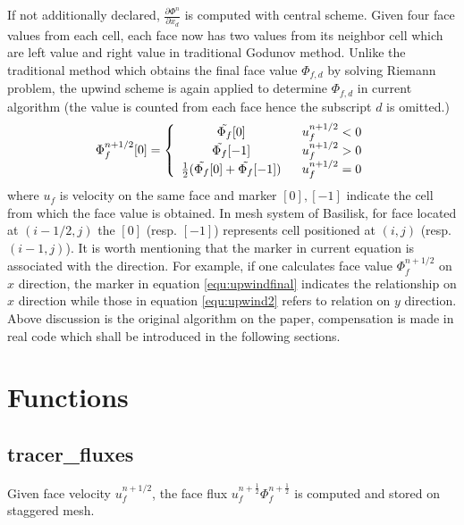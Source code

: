 \documentclass[a4paper]{article}
\newcommand{\func}[1]{\textbf{\textcolor{function}{#1}}}
\begin{document}
If not additionally declared, $\frac{\partial \Phi^n}{\partial x_d}$ is computed with central scheme.
Given four face values from each cell, each face now has two values from its neighbor cell which are left value and right value in traditional Godunov method. Unlike the traditional method which obtains the final face value $\Phi_{f,d}$ by solving Riemann problem, the upwind scheme is again applied to determine $\Phi_{f,d}$ in current algorithm (the value is counted from each face hence the subscript $d$ is omitted.)
\begin{equation}
    \Phi^{n+1/2}_{f}[0] = \left\{
    \begin{array}{cc}
         \Tilde{\Phi_f}[0]\ \ &u^{n+1/2}_f<0\\
         \Tilde{\Phi_f}[-1]\ \ &u^{n+1/2}_f>0\\
         \frac{1}{2}(\Tilde{\Phi_f}[0]+\Tilde{\Phi_f}[-1])\ \ &u^{n+1/2}_f=0
    \end{array}
    \right.
    \label{equ:upwindfinal}
\end{equation}
where $u_f$ is velocity on the same face and marker $[0],[-1]$ indicate the cell from which the face value is obtained. In mesh system of Basilisk, for face located at $(i-1/2,j)$ the $[0]$ (resp. $[-1]$) represents cell positioned at $(i,j)$ (resp. $(i-1,j)$). It is worth mentioning that the marker in current equation is associated with the direction. For example, if one calculates face value $\Phi_f^{n+1/2}$ on $x$ direction, the marker in equation \ref{equ:upwindfinal} indicates the relationship on $x$ direction while those in equation \ref{equ:upwind2} refers to relation on $y$ direction. Above discussion is the original algorithm on the paper, compensation is made in real code which shall be introduced in the following sections.
\section{Functions}

\subsection{\func{tracer\_fluxes}}
Given face velocity $u^{n+1/2}_f$, the face flux $u_{f}^{n+ \frac{1}{2}}\Phi_{f}^{n + \frac{1}{2}}$ is computed and stored on staggered mesh.
\end{document}
